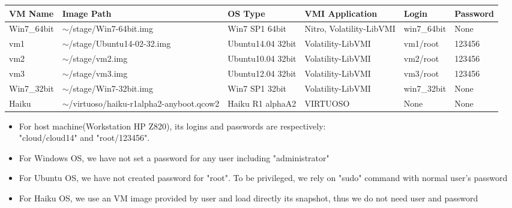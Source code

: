 \documentclass[11pt, oneside]{Thesis} %
\begin{document}
\clearpage %



\begin{center}
    \begin{tabular}{| p{2cm} |p{3cm} | p{2cm} | p{2cm} |p{2cm} |p{2cm}|}
    \hline
    VM Name & Image Path & OS Type & VMI Application & Login & Password  \\ 
    \hline
    Win7\_64bit & $\sim$/stage/Win7-64bit.img & Win7 SP1 64bit & Nitro, Volatility-LibVMI & win7\_64bit & None\\ 
    \hline
    vm1 & $\sim$/stage/Ubuntu14-02-32.img & Ubuntu14.04 32bit &Volatility-LibVMI & vm1/root & 123456\\
    \hline
    vm2 & $\sim$/stage/vm2.img & Ubuntu10.04 32bit &Volatility-LibVMI & vm2/root & 123456\\
    \hline
    vm3 & $\sim$/stage/vm3.img & Ubuntu12.04 32bit &Volatility-LibVMI & vm3/root & 123456\\
    \hline
    Win7\_32bit & $\sim$/stage/Win7-32bit.img & Win7 SP1 32bit & Volatility-LibVMI & win7\_32bit & None\\
    \hline
    Haiku & $\sim$/virtuoso/haiku-r1alpha2-anyboot.qcow2 & Haiku R1 alphaA2 & VIRTUOSO & None & None\\ 
    \hline
    \end{tabular}
    \begin{itemize}
     \item For host machine(Workstation HP Z820), its logins and passwords are respectively: \\ "cloud/cloud14" and "root/123456". 
     \item For Windows OS, we have not set a password for any user including "administrator"
     \item For Ubuntu OS, we have not created password for "root". To be privileged, we rely on "sudo" command with normal user's password
     \item For Haiku OS, we use an VM image provided by user and load directly its snapshot, thus we do not need user and password 
    \end{itemize}
\end{center}
\end{document}
